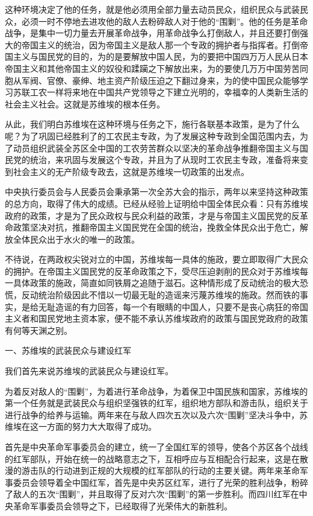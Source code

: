 这种环境决定了他的任务，就是他必须用全部力量去动员民众，组织民众与武装民众，必须一时不停地去进攻他的敌人去粉碎敌人对于他的“围剿”。他的任务是革命战争，是集中一切力量去开展革命战争，用革命战争么打倒敌人，并且还要打倒强大的帝国主义的统治，因为帝国主义是敌人那一个专政的拥护者与指挥者。打倒帝国主义与国民党的目的，为的是要解放中国人民，为的要把中国四万万人民从日本帝国主义和其他帝国主义的奴役和蹂躏之下解放出来，为的要使几万万中国劳苦同胞从军阀、官僚、豪绅、地主资产阶级压迫之下翻过身来，为的使中国民众能够学习苏联工农一样将来地在中国共产党领导之下建立光明的，幸福幸的人类新生活的社会主义社会。这就是苏维埃的根本任务。

从此，我们明白苏维埃在这种环境与任务之下，施行各联基本政策，是为了什么呢？为了巩固已经胜利了的工农民主专政，为了发展这种专政到全国范围内去，为了动员组织武装全苏区全中国的工农劳苦群众以坚决的革命战争推翻帝国主义与国民党的统治，来巩固与发展这个专政，并且为了从现时工农民主专政，准备将来变到社会主义的无产阶级专政去，这就是苏维埃一切政策的出发点。

中央执行委员会与人民委员会秉承第一次全苏大会的指示，两年以来坚持这种政策的总方向，取得了伟大的成绩。已经从经验上证明给中国全体民众看：只有苏维埃政府的政策，才是为了民众政权与民众利益的政策，才是与帝国主义国民党的反革命政策坚决对抗，推翻帝国主义国民党在全国的统治，挽救全体民众出于危亡，解放全体民众出于水火的唯一的政策。

不待说，在两政权尖锐对立的中国，苏维埃每一具体的施政，要立即取得广大民众的拥护。在帝国主义国民党的反革命政策之下，受尽压迫剥削的民众对于苏维埃每一具体政策的施政，简直如同铁屑之追随于滋石。这种情形成了反动统治的极大恐慌，反动统治阶级因此不惜以一切最无耻的造谣来污蔑苏维埃的施政。然而铁的事实，是给无耻造谣的有力回答，每一个有眼睛的中国人，只要不是丧心病狂的帝国主义者和国民党地主资本家，便不能不承认苏维埃政府的政策与国民党政府的政策有何等天渊之别。

一、苏维埃的武装民众与建设红军

我们首先来说苏维埃的武装民众与建设红军。

为着反对敌人的“围剿”，为着进行革命战争，为着保卫中国民族和国家，苏维埃的第一个任务就是武装民众与组织坚强铁的红军，组织地方部队和游击队，组织关于进行战争的给养与运输。两年来在与敌人四次五次以及六次“围剿”坚决斗争中，苏维埃在这一方面的努力大大取得了成功。

首先是中央革命军事委员会的建立，统一了全国红军的领导，使各个苏区各个战线的红军部队，开始在统一的战略意志之下，互相呼应与互相配合行起来，这是在散漫的游击队的行动进到正规的大规模的红军部队的行动的主要关键。两年来革命军事委员会领导着全中国红军，首先是中央苏区红军，进行了光荣的胜利战争，粉碎了敌人的五次“围剿”，并且取得了反对六次“围剿”的第一步胜利。而四川红军在中央革命军事委员会领导之下，已经取得了光荣伟大的新胜利。

